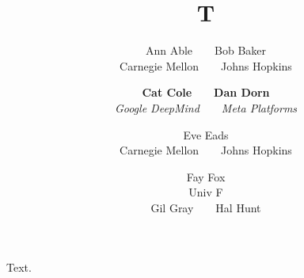 \documentclass{article}
\title{T}
\author{Ann Able~~~~Bob Baker \\ Carnegie Mellon~~~~Johns Hopkins
\and \textbf{Cat Cole}~~~~\textbf{Dan Dorn} \\ \textit{Google DeepMind}~~~~\textit{Meta Platforms}
\and Eve Eads \\ Carnegie Mellon~~~~Johns Hopkins
\and Fay Fox \\ Univ F \\ Gil Gray~~~~Hal Hunt}
\begin{document}
\maketitle
Text.
\end{document}
